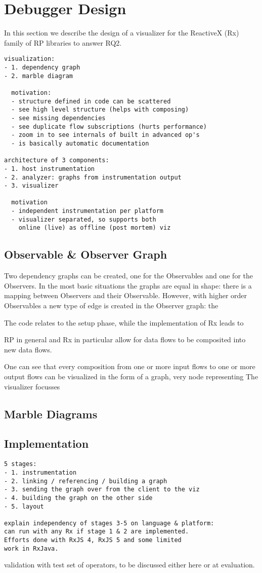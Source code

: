 \section{Debugger Design}
In this section we describe the design of a visualizer for the ReactiveX (Rx) family of RP libraries to answer RQ2.

{\color{red}
\begin{verbatim}
visualization:
- 1. dependency graph
- 2. marble diagram

  motivation:
  - structure defined in code can be scattered
  - see high level structure (helps with composing)
  - see missing dependencies
  - see duplicate flow subscriptions (hurts performance)
  - zoom in to see internals of built in advanced op's
  - is basically automatic documentation

architecture of 3 components:
- 1. host instrumentation
- 2. analyzer: graphs from instrumentation output
- 3. visualizer

  motivation
  - independent instrumentation per platform
  - visualizer separated, so supports both 
    online (live) as offline (post mortem) viz
\end{verbatim}
}


\subsection{Observable \& Observer Graph}
Two dependency graphs can be created, one for the Observables and one for the Observers. In the most basic situations the graphs are equal in shape: there is a mapping between Observers and their Observable. However, with higher order Observables a new type of edge is created in the Observer graph: the 

 The code relates to the setup phase, while the implementation of Rx leads to

RP in general and Rx in particular allow for data flows to be composited into new data flows. 


One can see that every composition from one or more input flows to one or more output flows can be visualized in the form of a graph, very node representing 
The visualizer focusses 

\subsection{Marble Diagrams}

\subsection{Implementation}
{\color{red}
\begin{verbatim}
5 stages:
- 1. instrumentation
- 2. linking / referencing / building a graph
- 3. sending the graph over from the client to the viz
- 4. building the graph on the other side
- 5. layout

explain independency of stages 3-5 on language & platform: 
can run with any Rx if stage 1 & 2 are implemented. 
Efforts done with RxJS 4, RxJS 5 and some limited 
work in RxJava.
\end{verbatim}
}

validation with test set of operators, to be discussed either here or at evaluation.

